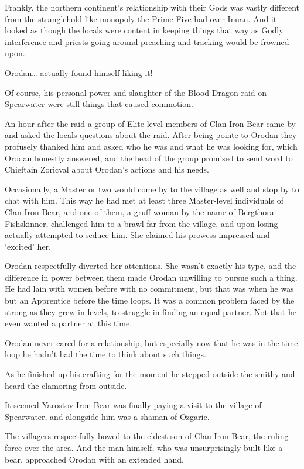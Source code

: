 \documentclass[a4paper,10pt]{book}
\begin{document}
Frankly, the northern continent’s relationship with their Gods was vastly different from the stranglehold-like monopoly the Prime Five had over Inuan. And it looked as though the locals were content in keeping things that way as Godly interference and priests going around preaching and tracking would be frowned upon.\par
Orodan… actually found himself liking it!\par
Of course, his personal power and slaughter of the Blood-Dragon raid on Spearwater were still things that caused commotion.\par
An hour after the raid a group of Elite-level members of Clan Iron-Bear came by and asked the locals questions about the raid. After being pointe to Orodan they profusely thanked him and asked who he was and what he was looking for, which Orodan honestly answered, and the head of the group promised to send word to Chieftain Zoricval about Orodan’s actions and his needs.\par
Occasionally, a Master or two would come by to the village as well and stop by to chat with him. This way he had met at least three Master-level individuals of Clan Iron-Bear, and one of them, a gruff woman by the name of Bergthora Fishskinner, challenged him to a brawl far from the village, and upon losing actually attempted to seduce him. She claimed his prowess impressed and ‘excited’ her.\par
Orodan respectfully diverted her attentions. She wasn’t exactly his type, and the difference in power between them made Orodan unwilling to pursue such a thing. He had lain with women before with no commitment, but that was when he was but an Apprentice before the time loops. It was a common problem faced by the strong as they grew in levels, to struggle in finding an equal partner. Not that he even wanted a partner at this time.\par
Orodan never cared for a relationship, but especially now that he was in the time loop he hadn’t had the time to think about such things.\par
As he finished up his crafting for the moment he stepped outside the smithy and heard the clamoring from outside.\par
It seemed Yarostov Iron-Bear was finally paying a visit to the village of Spearwater, and alongside him was a shaman of Ozgaric.\par
The villagers respectfully bowed to the eldest son of Clan Iron-Bear, the ruling force over the area. And the man himself, who was unsurprisingly built like a bear, approached Orodan with an extended hand.\par
\end{document}
